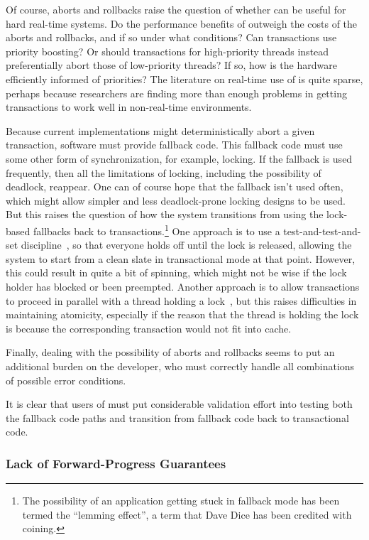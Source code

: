 Of course, aborts and rollbacks raise the question of whether  can
be useful for hard real-time systems.
Do the performance benefits of  outweigh the costs of the aborts
and rollbacks, and if so under what conditions?
Can transactions use priority boosting?
Or should transactions for high-priority threads instead preferentially
abort those of low-priority threads?
If so, how is the hardware efficiently informed of priorities?
The literature on real-time use of  is quite sparse, perhaps because
researchers are finding more than enough problems in getting
transactions to work well in non-real-time environments.

Because current  implementations might deterministically abort a
given transaction, software must provide fallback code.
This fallback code must use some other form of synchronization, for
example, locking.
If the fallback is used frequently, then all the limitations of locking,
including the possibility of deadlock, reappear.
One can of course hope that the fallback isn't used often, which might
allow simpler and less deadlock-prone locking designs to be used.
But this raises the question of how the system transitions from using
the lock-based fallbacks back to transactions.\footnote{
	The possibility of an application getting stuck in fallback
	mode has been termed the ``lemming effect'', a term that
	Dave Dice has been credited with coining.}
One approach is to use a test-and-test-and-set discipline~\cite{Martinez02a},
so that everyone holds off until the lock is released, allowing the
system to start from a clean slate in transactional mode at that point.
However, this could result in quite a bit of spinning, which might not
be wise if the lock holder has blocked or been preempted.
Another approach is to allow transactions to proceed in parallel with
a thread holding a lock~\cite{Martinez02a}, but this raises difficulties
in maintaining atomicity, especially if the reason that the thread is
holding the lock is because the corresponding transaction would not fit
into cache.

Finally, dealing with the possibility of aborts and rollbacks seems to
put an additional burden on the developer, who must correctly handle
all combinations of possible error conditions.

It is clear that users of  must put considerable validation effort
into testing both the fallback code paths and transition from fallback
code back to transactional code.

\subsubsection{Lack of Forward-Progress Guarantees}
\label{sec:future:Lack of Forward-Progress Guarantees}

